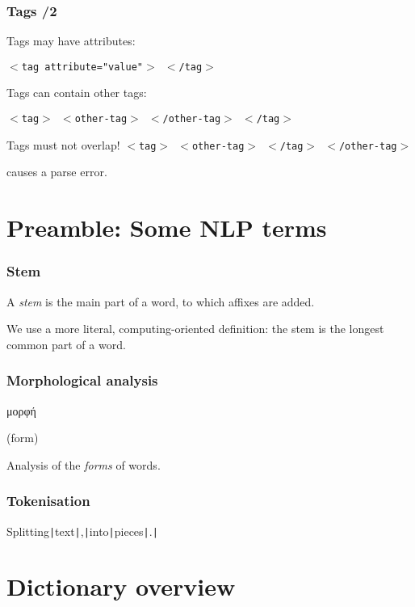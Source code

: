 \documentclass{beamer} %
\newcommand\grktext[1]{{\fontencoding{LGR}\fontfamily{pmt}\selectfont #1}}
\begin{document}
\begin{frame}
  \frametitle{Tags /2}
  Tags may have attributes: 

  {\tt $<$tag attribute="value"$>$ $<$/tag$>$}

  Tags can contain other tags: 

  {\tt $<$tag$>$ $<$other-tag$>$ $<$/other-tag$>$ $<$/tag$>$}

  \begin{alertblock}{Tags must not overlap!}
    {\tt $<$tag$>$ $<$other-tag$>$ $<$/tag$>$ $<$/other-tag$>$}

   causes a parse error. 
  \end{alertblock}
\end{frame}

\section{Preamble: Some NLP terms}

\begin{frame}
\frametitle{Stem}
A {\it stem} is the main part of a word, to which affixes are added.

\pause

We use a more literal, computing-oriented definition: the stem is the longest
common part of a word.

\end{frame}

\begin{frame}
\frametitle{Morphological analysis}

 \begin{center}
 {\Large \grktext{μορφή}}
 \end{center}

\pause
  \begin{center}
   (form)
  \end{center}

\pause

Analysis of the {\it forms} of words.

\end{frame}

\begin{frame}
\frametitle{Tokenisation}

  Splitting{\tt |}text{\tt |},{\tt |}into{\tt |}pieces{\tt |}.{\tt |}

\end{frame}

\section{Dictionary overview}
\end{document}
